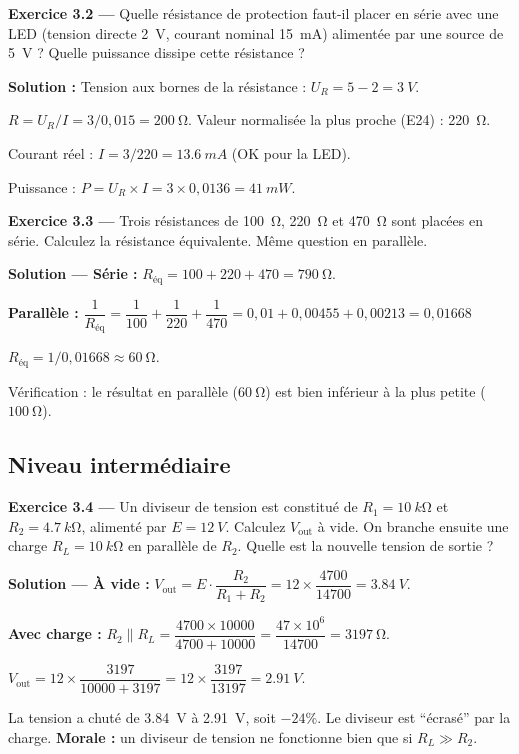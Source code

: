 \documentclass[12pt,a4paper,twoside]{book}
\begin{document}
\textbf{Exercice 3.2 —} Quelle résistance de protection faut-il placer en série avec une LED (tension directe \SI{2}{V}, courant nominal \SI{15}{mA}) alimentée par une source de \SI{5}{V} ? Quelle puissance dissipe cette résistance ?

\begin{pratique}
\textbf{Solution :} Tension aux bornes de la résistance : $U_R = 5 - 2 = \SI{3}{V}$.

$R = U_R / I = 3 / 0{,}015 = \SI{200}{\ohm}$. Valeur normalisée la plus proche (E24) : \SI{220}{\ohm}.

Courant réel : $I = 3/220 = \SI{13.6}{mA}$ (OK pour la LED).

Puissance : $P = U_R \times I = 3 \times 0{,}0136 = \SI{41}{mW}$.
\end{pratique}

\textbf{Exercice 3.3 —} Trois résistances de \SI{100}{\ohm}, \SI{220}{\ohm} et \SI{470}{\ohm} sont placées en série. Calculez la résistance équivalente. Même question en parallèle.

\begin{pratique}
\textbf{Solution — Série :} $R_{\text{éq}} = 100 + 220 + 470 = \SI{790}{\ohm}$.

\textbf{Parallèle :} $\dfrac{1}{R_{\text{éq}}} = \dfrac{1}{100} + \dfrac{1}{220} + \dfrac{1}{470} = 0{,}01 + 0{,}00455 + 0{,}00213 = 0{,}01668$

$R_{\text{éq}} = 1/0{,}01668 \approx \SI{60}{\ohm}$.

Vérification : le résultat en parallèle ($\SI{60}{\ohm}$) est bien inférieur à la plus petite ($\SI{100}{\ohm}$). \checkmark
\end{pratique}

\subsection*{Niveau intermédiaire}

\textbf{Exercice 3.4 —} Un diviseur de tension est constitué de $R_1 = \SI{10}{k\ohm}$ et $R_2 = \SI{4.7}{k\ohm}$, alimenté par $E = \SI{12}{V}$. Calculez $V_{\text{out}}$ à vide. On branche ensuite une charge $R_L = \SI{10}{k\ohm}$ en parallèle de $R_2$. Quelle est la nouvelle tension de sortie ?

\begin{pratique}
\textbf{Solution — À vide :} $V_{\text{out}} = E \cdot \dfrac{R_2}{R_1+R_2} = 12 \times \dfrac{4700}{14700} = \SI{3.84}{V}$.

\textbf{Avec charge :} $R_2 \parallel R_L = \dfrac{4700 \times 10000}{4700 + 10000} = \dfrac{47 \times 10^6}{14700} = \SI{3197}{\ohm}$.

$V_{\text{out}} = 12 \times \dfrac{3197}{10000 + 3197} = 12 \times \dfrac{3197}{13197} = \SI{2.91}{V}$.

La tension a chuté de \SI{3.84}{V} à \SI{2.91}{V}, soit $-24\%$. Le diviseur est ``écrasé'' par la charge. \textbf{Morale :} un diviseur de tension ne fonctionne bien que si $R_L \gg R_2$.
\end{pratique}
\end{document}

